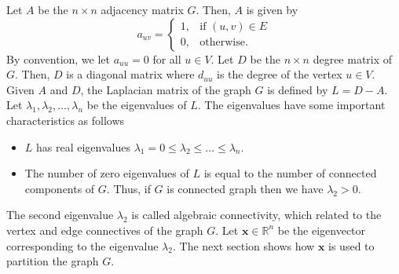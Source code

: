 \documentclass[pdftex, 12pt, a4paper]{article}
\begin{document}
Let $A$ be the $n \times n$ adjacency matrix $G$. Then, $A$ is given by
\[
    a_{uv} = \begin{cases}
    1, & \text{if } (u, v) \in E\\
    0, & \text{otherwise}.
    \end{cases}
\]
By convention, we let $a_{uu} = 0$ for all $u \in V$.
Let $D$ be the $n\times n$ degree matrix of $G$. Then, $D$ is a diagonal matrix where $d_{uu}$ is the degree of the vertex $u \in V$. Given $A$ and $D$, the Laplacian matrix of the graph $G$ is defined by $L = D - A$. Let $\lambda_1, \lambda_2, \ldots, \lambda_n$ be the eigenvalues of $L$. The eigenvalues have some important characteristics as follows
\begin{itemize}
    \item $L$ has real eigenvalues $\lambda_1 = 0 \leq \lambda_2 \leq \ldots \leq \lambda_n$.
    \item The number of zero eigenvalues of $L$ is equal to the number of connected components of $G$. Thus, if $G$ is connected graph then we have $\lambda_2 > 0$.
\end{itemize}
The second eigenvalue $\lambda_2$ is called algebraic connectivity, which related to the vertex and edge connectives of the graph $G$. Let $\mathbf{x} \in \mathbb{R}^n$ be the eigenvector corresponding to the eigenvalue $\lambda_2$. The next section shows how $\mathbf{x}$ is used to partition the graph $G$.
\end{document}
